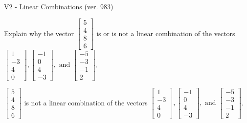\begin{exercise}
  \begin{exerciseTitle}V2 - Linear Combinations (ver. 983)\end{exerciseTitle}
  \begin{exerciseStatement}
    Explain why the vector \(\left[\begin{array}{c}
5 \\
4 \\
8 \\
6
\end{array}\right]\)  is or is not a linear 
	combination of the vectors \(\left[\begin{array}{c}
1 \\
-3 \\
4 \\
0
\end{array}\right] , \left[\begin{array}{c}
-1 \\
0 \\
4 \\
-3
\end{array}\right] , \text{ and } \left[\begin{array}{c}
-5 \\
-3 \\
-1 \\
2
\end{array}\right]\).
	


  \end{exerciseStatement}
  \begin{exerciseAnswer}
   \(\left[\begin{array}{c}
5 \\
4 \\
8 \\
6
\end{array}\right]\) 
  	 is not  
	a linear combination of the vectors \(\left[\begin{array}{c}
1 \\
-3 \\
4 \\
0
\end{array}\right] , \left[\begin{array}{c}
-1 \\
0 \\
4 \\
-3
\end{array}\right] , \text{ and } \left[\begin{array}{c}
-5 \\
-3 \\
-1 \\
2
\end{array}\right]\).

	
  


  \end{exerciseAnswer}
\end{exercise}